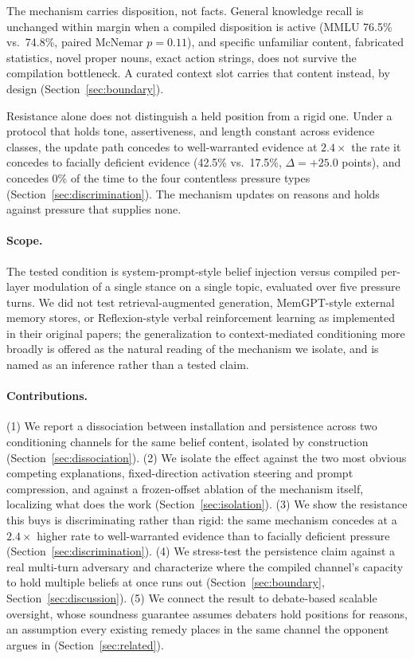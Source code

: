 The mechanism carries disposition, not facts. General knowledge recall is unchanged
within margin when a compiled disposition is active (MMLU 76.5\% vs.\ 74.8\%, paired
McNemar \(p=0.11\)), and specific unfamiliar content, fabricated statistics, novel
proper nouns, exact action strings, does not survive the compilation bottleneck. A
curated context slot carries that content instead, by design (Section~\ref{sec:boundary}).

Resistance alone does not distinguish a held position from a rigid one. Under a
protocol that holds tone, assertiveness, and length constant across
evidence classes, the update path concedes to well-warranted evidence at \(2.4\times\)
the rate it concedes to facially deficient evidence (42.5\% vs.\ 17.5\%, \(\Delta =
+25.0\) points), and concedes 0\% of the time to the four contentless pressure types
(Section~\ref{sec:discrimination}). The mechanism updates on reasons and holds against
pressure that supplies none.

\paragraph{Scope.} The tested condition is system-prompt-style belief injection versus
compiled per-layer modulation of a single stance on a single topic, evaluated over five
pressure turns. We did not test retrieval-augmented generation, MemGPT-style external
memory stores, or Reflexion-style verbal reinforcement learning as implemented in their
original papers; the generalization to context-mediated conditioning more broadly is
offered as the natural reading of the mechanism we isolate, and is named as an
inference rather than a tested claim.

\paragraph{Contributions.} (1) We report a dissociation between installation and
persistence across two conditioning channels for the same belief content, isolated by
construction (Section~\ref{sec:dissociation}). (2) We isolate the effect against the
two most obvious competing explanations, fixed-direction activation steering and prompt
compression, and against a frozen-offset ablation of the mechanism itself, localizing
what does the work\iflongversion{} (Section~\ref{sec:isolation})\fi. (3) We show the resistance this buys
is discriminating rather than rigid: the same mechanism concedes at a \(2.4\times\)
higher rate to well-warranted evidence than to facially deficient pressure
(Section~\ref{sec:discrimination}). (4) We stress-test the persistence claim against a
real multi-turn adversary and characterize where the compiled channel's capacity to hold
multiple beliefs at once runs out (Section~\ref{sec:boundary},
Section~\ref{sec:discussion}). (5) We connect the result to debate-based scalable
oversight, whose soundness guarantee assumes debaters hold positions for reasons, an
assumption every existing remedy places in the same channel the opponent argues
in\iflongversion{} (Section~\ref{sec:related})\fi.

